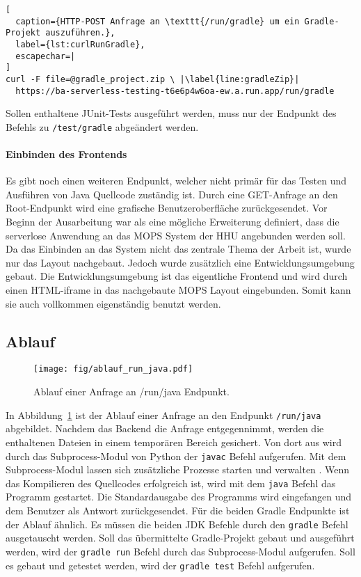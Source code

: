\begin{lstlisting}[
  caption={HTTP-POST Anfrage an \texttt{/run/gradle} um ein Gradle-Projekt auszuführen.},
  label={lst:curlRunGradle},
  escapechar=|
]
curl -F file=@gradle_project.zip \ |\label{line:gradleZip}|
  https://ba-serverless-testing-t6e6p4w6oa-ew.a.run.app/run/gradle
\end{lstlisting}

Sollen enthaltene JUnit-Tests ausgeführt werden,
muss nur der Endpunkt des Befehls zu \texttt{/test/gradle} abgeändert werden.

\paragraph{Einbinden des Frontends} Es gibt noch einen weiteren Endpunkt, welcher
nicht primär für das Testen und Ausführen von Java Quellcode zuständig ist.
Durch eine GET-Anfrage an den Root-Endpunkt wird eine grafische Benutzeroberfläche zurückgesendet.
Vor Beginn der Ausarbeitung war als eine mögliche Erweiterung definiert, dass die serverlose Anwendung an
das MOPS System der HHU angebunden werden soll. Da das Einbinden an das System nicht
das zentrale Thema der Arbeit ist, wurde nur das Layout nachgebaut.
Jedoch wurde zusätzlich eine Entwicklungsumgebung gebaut.
Die Entwicklungsumgebung ist das eigentliche Frontend und wird durch einen HTML-iframe
in das nachgebaute MOPS Layout eingebunden. Somit kann sie auch vollkommen eigenständig benutzt werden.

\subsection{Ablauf}
\begin{figure}
  \centering
  \texttt{[image: fig/ablauf\_run\_java.pdf]}
  \caption{Ablauf einer Anfrage an /run/java Endpunkt.}
  \label{fig:ablauf_run_java}
\end{figure}

In Abbildung~\ref{fig:ablauf_run_java} ist der Ablauf einer Anfrage an den Endpunkt
\texttt{/run/java} abgebildet. Nachdem das Backend die Anfrage entgegennimmt,
werden die enthaltenen Dateien in einem temporären Bereich gesichert.
Von dort aus wird durch das Subprocess-Modul von Python der \texttt{javac} Befehl aufgerufen.
Mit dem Subprocess-Modul lassen sich zusätzliche Prozesse starten und verwalten \cite{PythonSubprocess}.
Wenn das Kompilieren des Quellcodes erfolgreich ist, wird mit dem \texttt{java} Befehl
das Programm gestartet. Die Standardausgabe des Programms wird eingefangen und
dem Benutzer als Antwort zurückgesendet. Für die beiden Gradle Endpunkte ist der Ablauf ähnlich.
Es müssen die beiden JDK Befehle durch den \texttt{gradle}
Befehl ausgetauscht werden. Soll das übermittelte Gradle-Projekt gebaut und ausgeführt
werden, wird der \texttt{gradle run} Befehl durch das Subprocess-Modul aufgerufen.
Soll es gebaut und getestet werden, wird der \texttt{gradle test} Befehl aufgerufen.

